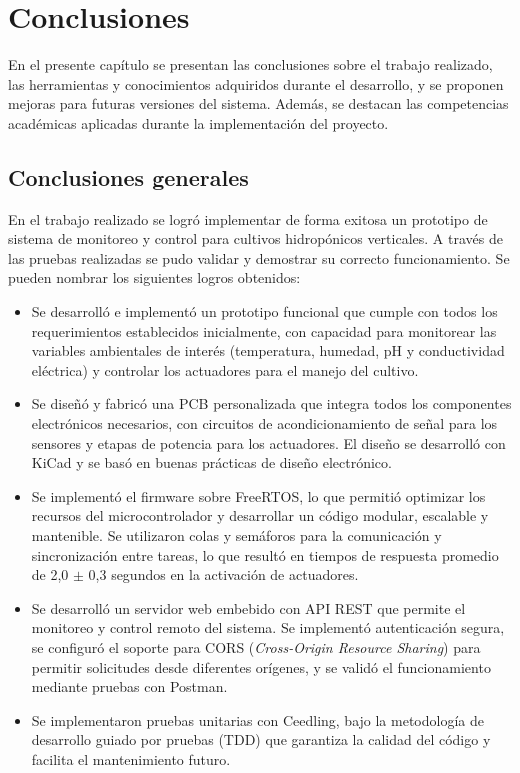 \chapter{Conclusiones}

\label{Chapter5}

En el presente capítulo se presentan las conclusiones sobre el trabajo realizado, las herramientas y conocimientos adquiridos durante el desarrollo, y se proponen mejoras para futuras versiones del sistema. Además, se destacan las competencias académicas aplicadas durante la implementación del proyecto.

\section{Conclusiones generales}

En el trabajo realizado se logró implementar de forma exitosa un prototipo de sistema de monitoreo y control para cultivos hidropónicos verticales. A través de las pruebas realizadas se pudo validar y demostrar su correcto funcionamiento. Se pueden nombrar los siguientes logros obtenidos:

\begin{itemize}
    \item Se desarrolló e implementó un prototipo funcional que cumple con todos los requerimientos establecidos inicialmente, con capacidad para monitorear las variables ambientales de interés (temperatura, humedad, pH y conductividad eléctrica) y controlar los actuadores para el manejo del cultivo.
    
    \item Se diseñó y fabricó una PCB personalizada que integra todos los componentes electrónicos necesarios, con circuitos de acondicionamiento de señal para los sensores y etapas de potencia para los actuadores. El diseño se desarrolló con KiCad y se basó en buenas prácticas de diseño electrónico.
    
    \item Se implementó el firmware sobre FreeRTOS, lo que permitió optimizar los recursos del microcontrolador y desarrollar un código modular, escalable y mantenible. Se utilizaron colas y semáforos para la comunicación y sincronización entre tareas, lo que resultó en tiempos de respuesta promedio de 2,0 $\pm$ 0,3 segundos en la activación de actuadores.
    
    \item Se desarrolló un servidor web embebido con API REST que permite el monitoreo y control remoto del sistema. Se implementó autenticación segura, se configuró el soporte para CORS (\textit{Cross-Origin Resource Sharing}) para permitir solicitudes desde diferentes orígenes, y se validó el funcionamiento mediante pruebas con Postman.
    
    \item Se implementaron pruebas unitarias con Ceedling, bajo la metodología de desarrollo guiado por pruebas (TDD) que garantiza la calidad del código y facilita el mantenimiento futuro.
\end{itemize}


